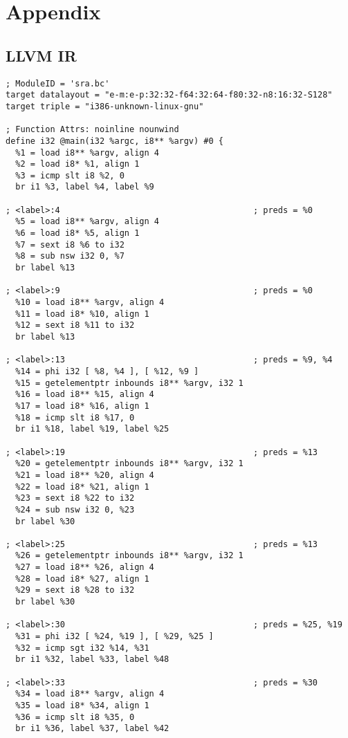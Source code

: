 \chapter{Appendix}

\lstset{language=LLVM,style=Cstyle}
\section{LLVM IR}

\begin{lstlisting}
; ModuleID = 'sra.bc'
target datalayout = "e-m:e-p:32:32-f64:32:64-f80:32-n8:16:32-S128"
target triple = "i386-unknown-linux-gnu"

; Function Attrs: noinline nounwind
define i32 @main(i32 %argc, i8** %argv) #0 {
  %1 = load i8** %argv, align 4
  %2 = load i8* %1, align 1
  %3 = icmp slt i8 %2, 0
  br i1 %3, label %4, label %9

; <label>:4                                       ; preds = %0
  %5 = load i8** %argv, align 4
  %6 = load i8* %5, align 1
  %7 = sext i8 %6 to i32
  %8 = sub nsw i32 0, %7
  br label %13

; <label>:9                                       ; preds = %0
  %10 = load i8** %argv, align 4
  %11 = load i8* %10, align 1
  %12 = sext i8 %11 to i32
  br label %13

; <label>:13                                      ; preds = %9, %4
  %14 = phi i32 [ %8, %4 ], [ %12, %9 ]
  %15 = getelementptr inbounds i8** %argv, i32 1
  %16 = load i8** %15, align 4
  %17 = load i8* %16, align 1
  %18 = icmp slt i8 %17, 0
  br i1 %18, label %19, label %25

; <label>:19                                      ; preds = %13
  %20 = getelementptr inbounds i8** %argv, i32 1
  %21 = load i8** %20, align 4
  %22 = load i8* %21, align 1
  %23 = sext i8 %22 to i32
  %24 = sub nsw i32 0, %23
  br label %30

; <label>:25                                      ; preds = %13
  %26 = getelementptr inbounds i8** %argv, i32 1
  %27 = load i8** %26, align 4
  %28 = load i8* %27, align 1
  %29 = sext i8 %28 to i32
  br label %30

; <label>:30                                      ; preds = %25, %19
  %31 = phi i32 [ %24, %19 ], [ %29, %25 ]
  %32 = icmp sgt i32 %14, %31
  br i1 %32, label %33, label %48

; <label>:33                                      ; preds = %30
  %34 = load i8** %argv, align 4
  %35 = load i8* %34, align 1
  %36 = icmp slt i8 %35, 0
  br i1 %36, label %37, label %42


\end{lstlisting}
